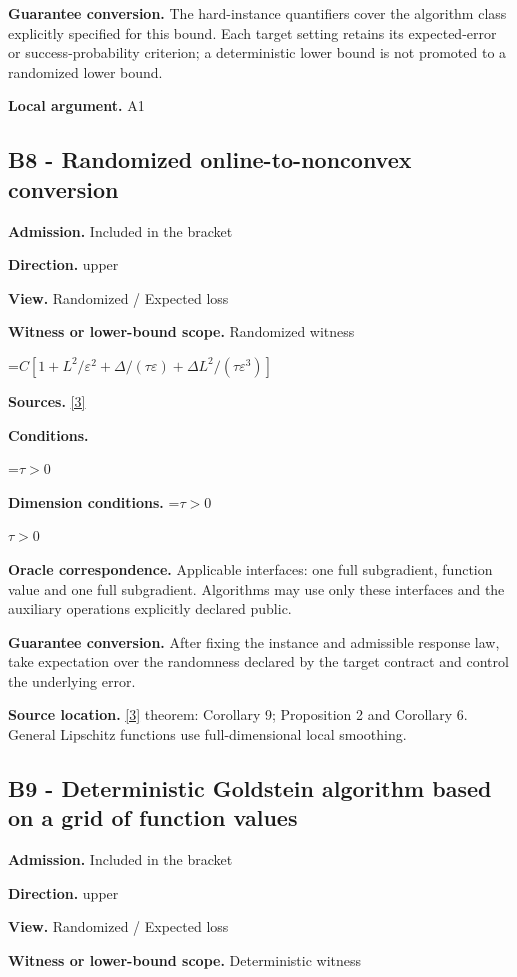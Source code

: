 \documentclass[10pt,a4paper]{article}
\newcommand{\AtlasMath}[1]{\par\begingroup\centering\setbox0=\hbox{$\displaystyle #1$}\ifdim\wd0>1.4\linewidth\typeout{ATLAS WIDE FORMULA: \the\wd0}\fi\ifdim\wd0>\linewidth\resizebox{\linewidth}{!}{\box0}\else\box0\fi\par\endgroup}
\newcommand{\AtlasInlineMath}[1]{\begingroup\setbox0=\hbox{$#1$}\ifdim\wd0>.4\linewidth\endgroup\AtlasMath{#1}\else\endgroup$#1$\fi}
\begin{document}
\textbf{Guarantee conversion.} The hard-instance quantifiers cover the algorithm class explicitly specified for this bound. Each target setting retains its expected-error or success-probability criterion; a deterministic lower bound is not promoted to a randomized lower bound.

\textbf{Local argument.} A1

\subsection{B8 - Randomized online-to-nonconvex conversion}
\textbf{Admission.} Included in the bracket

\textbf{Direction.} upper

\textbf{View.} Randomized / Expected loss

\textbf{Witness or lower-bound scope.} Randomized witness

\AtlasMath{C[1+L^2/\varepsilon^2+\Delta/(\tau\varepsilon)+\Delta L^2/(\tau\varepsilon^3)]}
\textbf{Sources.} \href{https://arxiv.org/pdf/2302.03775}{[3]}

\textbf{Conditions.} 
\AtlasMath{\tau>0}


\textbf{Dimension conditions.} \AtlasInlineMath{\tau>0}

\textbf{Oracle correspondence.} Applicable interfaces: one full subgradient, function value and one full subgradient. Algorithms may use only these interfaces and the auxiliary operations explicitly declared public.

\textbf{Guarantee conversion.} After fixing the instance and admissible response law, take expectation over the randomness declared by the target contract and control the underlying error.

\textbf{Source location.} \href{https://arxiv.org/pdf/2302.03775}{[3]} theorem: Corollary 9; Proposition 2 and Corollary 6. General Lipschitz functions use full-dimensional local smoothing.

\subsection{B9 - Deterministic Goldstein algorithm based on a grid of function values}
\textbf{Admission.} Included in the bracket

\textbf{Direction.} upper

\textbf{View.} Randomized / Expected loss

\textbf{Witness or lower-bound scope.} Deterministic witness
\end{document}
